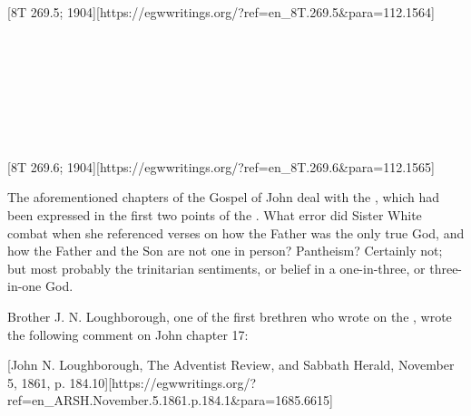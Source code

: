 [8T 269.5; 1904][https://egwwritings.org/?ref=en\_8T.269.5&para=112.1564]

 \\
 \\
 \\
 \\
 \\
 \\
 \\
[8T 269.6; 1904][https://egwwritings.org/?ref=en\_8T.269.6&para=112.1565]

The aforementioned chapters of the Gospel of John deal with the , which had been expressed in the first two points of the . What error did Sister White combat when she referenced verses on how the Father was the only true God, and how the Father and the Son are not one in person? Pantheism? Certainly not; but most probably the trinitarian sentiments, or belief in a one-in-three, or three-in-one God.

Brother J. N. Loughborough, one of the first brethren who wrote on the , wrote the following comment on John chapter 17:

[John N. Loughborough, The Adventist Review, and Sabbath Herald, November 5, 1861, p. 184.10][https://egwwritings.org/?ref=en\_ARSH.November.5.1861.p.184.1&para=1685.6615]


